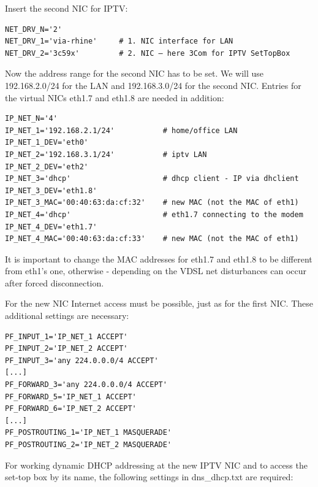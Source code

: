 \noindent Insert the second NIC for IPTV:\\

\begin{example}
\begin{verbatim}
NET_DRV_N='2'
NET_DRV_1='via-rhine'     # 1. NIC interface for LAN
NET_DRV_2='3c59x'         # 2. NIC – here 3Com for IPTV SetTopBox
\end{verbatim}
\end{example}

Now the address range for the second NIC has to be set. We will use
192.168.2.0/24 for the LAN and 192.168.3.0/24 for the second NIC.
Entries for the virtual NICs eth1.7 and eth1.8 are needed in addition:\\

\begin{example}
\begin{verbatim}
IP_NET_N='4'
IP_NET_1='192.168.2.1/24'           # home/office LAN
IP_NET_1_DEV='eth0'
IP_NET_2='192.168.3.1/24'           # iptv LAN
IP_NET_2_DEV='eth2'
IP_NET_3='dhcp'                     # dhcp client - IP via dhclient
IP_NET_3_DEV='eth1.8'
IP_NET_3_MAC='00:40:63:da:cf:32'    # new MAC (not the MAC of eth1)
IP_NET_4='dhcp'                     # eth1.7 connecting to the modem
IP_NET_4_DEV='eth1.7'
IP_NET_4_MAC='00:40:63:da:cf:33'    # new MAC (not the MAC of eth1)
\end{verbatim}
\end{example}

It is important to change the MAC addresses for eth1.7 and eth1.8 to
be different from eth1's one, otherwise - depending on the VDSL net
disturbances can occur after forced disconnection.

For the new NIC Internet access must be possible, just as
for the first NIC. These additional settings are necessary:\\

\begin{example}
\begin{verbatim}
PF_INPUT_1='IP_NET_1 ACCEPT'
PF_INPUT_2='IP_NET_2 ACCEPT'
PF_INPUT_3='any 224.0.0.0/4 ACCEPT'
[...]
PF_FORWARD_3='any 224.0.0.0/4 ACCEPT'
PF_FORWARD_5='IP_NET_1 ACCEPT'
PF_FORWARD_6='IP_NET_2 ACCEPT'
[...]
PF_POSTROUTING_1='IP_NET_1 MASQUERADE'
PF_POSTROUTING_2='IP_NET_2 MASQUERADE'
\end{verbatim}
\end{example}

For working dynamic DHCP addressing at the new IPTV NIC and to access
the set-top box by its name, the following settings in dns\_dhcp.txt are
required:\\

